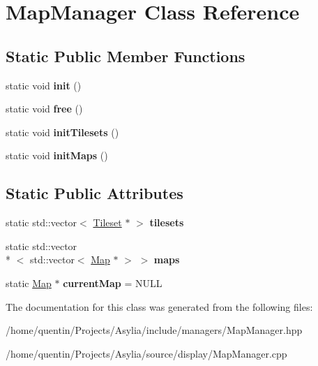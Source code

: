 \hypertarget{classMapManager}{\section{Map\-Manager Class Reference}
\label{classMapManager}
}
\subsection*{Static Public Member Functions}
\begin{DoxyCompactItemize}
\item 
\hypertarget{classMapManager_abac61fe753811dabe315396d1410537a}{static void {\bfseries init} ()}\label{classMapManager_abac61fe753811dabe315396d1410537a}

\item 
\hypertarget{classMapManager_a69f9992c032468fc5420a11aa5dfa737}{static void {\bfseries free} ()}\label{classMapManager_a69f9992c032468fc5420a11aa5dfa737}

\item 
\hypertarget{classMapManager_aab0844b3d4e9b1d1c70932541bd9120d}{static void {\bfseries init\-Tilesets} ()}\label{classMapManager_aab0844b3d4e9b1d1c70932541bd9120d}

\item 
\hypertarget{classMapManager_ae211956a705522b9c105a619731e8ad7}{static void {\bfseries init\-Maps} ()}\label{classMapManager_ae211956a705522b9c105a619731e8ad7}

\end{DoxyCompactItemize}
\subsection*{Static Public Attributes}
\begin{DoxyCompactItemize}
\item 
\hypertarget{classMapManager_a13d7a8755a733da69075bbefb67d287b}{static std\-::vector$<$ \hyperlink{structTileset}{Tileset} $\ast$ $>$ {\bfseries tilesets}}\label{classMapManager_a13d7a8755a733da69075bbefb67d287b}

\item 
\hypertarget{classMapManager_a640acf692080c83621a463ce4604ae6c}{static std\-::vector\\*
$<$ std\-::vector$<$ \hyperlink{classMap}{Map} $\ast$ $>$ $>$ {\bfseries maps}}\label{classMapManager_a640acf692080c83621a463ce4604ae6c}

\item 
\hypertarget{classMapManager_abb96d305c1da367d2decd56ea2796913}{static \hyperlink{classMap}{Map} $\ast$ {\bfseries current\-Map} = N\-U\-L\-L}\label{classMapManager_abb96d305c1da367d2decd56ea2796913}

\end{DoxyCompactItemize}


The documentation for this class was generated from the following files\-:\begin{DoxyCompactItemize}
\item 
/home/quentin/\-Projects/\-Asylia/include/managers/Map\-Manager.\-hpp\item 
/home/quentin/\-Projects/\-Asylia/source/display/Map\-Manager.\-cpp\end{DoxyCompactItemize}
